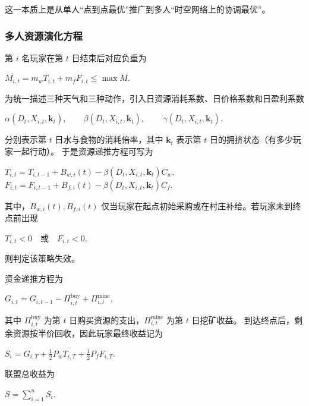 这一本质上是从单人“点到点最优”推广到多人“时空网络上的协调最优”。

\subsubsection{多人资源演化方程}

第 $i$ 名玩家在第 $t$ 日结束后对应负重为

\begin{center}
    $M_{i,t}=m_w T_{i,t}+m_f F_{i,t} \le \max M.$
\end{center}

为统一描述三种天气和三种动作，引入日资源消耗系数、日价格系数和日盈利系数

\begin{center}
    $\alpha(D_t,X_{i,t},\mathbf k_t),\qquad \beta(D_t,X_{i,t},\mathbf k_t)$,
    $\qquad \gamma(D_t,X_{i,t},\mathbf k_t)$.
\end{center}

分别表示第 $t$ 日水与食物的消耗倍率，其中 $\mathbf k_t$ 表示第 $t$ 日的拥挤状态（有多少玩家一起行动）。
%
于是资源递推方程可写为

\begin{center}
    $T_{i,t}=T_{i,t-1}+B_{w,i}(t)-\beta(D_t,X_{i,t},\mathbf k_t)C_w,$
    $F_{i,t}=F_{i,t-1}+B_{f,i}(t)-\beta(D_t,X_{i,t},\mathbf k_t)C_f.$
\end{center}

其中，$B_{w,i}(t),B_{f,i}(t)$ 仅当玩家在起点初始采购或在村庄补给。若玩家未到终点前出现

\begin{center}
    $T_{i,t}<0 \quad \text{或} \quad F_{i,t}<0,$
\end{center}

则判定该策略失效。

资金递推方程为

\begin{center}
    $G_{i,t}=G_{i,t-1}-\Pi_{i,t}^{\text{buy}}+\Pi_{i,t}^{\text{mine}},$
\end{center}

其中 $\Pi_{i,t}^{\text{buy}}$ 为第 $t$ 日购买资源的支出，$\Pi_{i,t}^{\text{mine}}$ 为第 $t$ 日挖矿收益。
%
到达终点后，剩余资源按半价回收，因此玩家最终收益记为

\begin{center}
    $S_i=G_{i,T}+\frac12 P_w T_{i,T}+\frac12 P_f F_{i,T}.$
\end{center}

联盟总收益为

\begin{center}
    $S=\sum_{i=1}^n S_i.$
\end{center}

